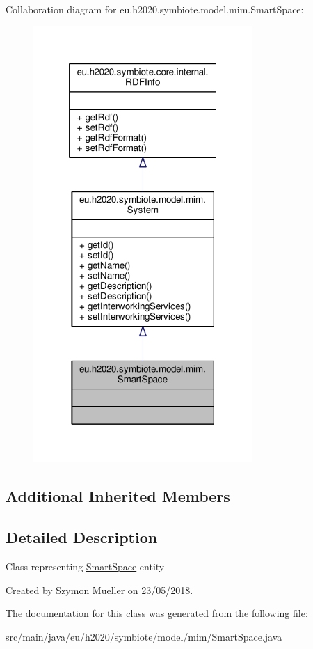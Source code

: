 Collaboration diagram for eu.\+h2020.\+symbiote.\+model.\+mim.\+Smart\+Space\+:\nopagebreak
\begin{figure}[H]
\begin{center}
\leavevmode
\includegraphics[width=236pt]{classeu_1_1h2020_1_1symbiote_1_1model_1_1mim_1_1SmartSpace__coll__graph}
\end{center}
\end{figure}
\subsection*{Additional Inherited Members}


\subsection{Detailed Description}
Class representing \hyperlink{classeu_1_1h2020_1_1symbiote_1_1model_1_1mim_1_1SmartSpace}{Smart\+Space} entity

Created by Szymon Mueller on 23/05/2018. 

The documentation for this class was generated from the following file\+:\begin{DoxyCompactItemize}
\item 
src/main/java/eu/h2020/symbiote/model/mim/Smart\+Space.\+java\end{DoxyCompactItemize}
